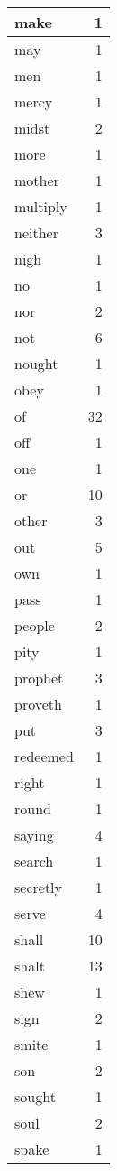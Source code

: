 \begin{center}
\begin{longtable}{l|r}
make & 1 \\ \hline
may & 1 \\ \hline
men & 1 \\ \hline
mercy & 1 \\ \hline
midst & 2 \\ \hline
more & 1 \\ \hline
mother & 1 \\ \hline
multiply & 1 \\ \hline
neither & 3 \\ \hline
nigh & 1 \\ \hline
no & 1 \\ \hline
nor & 2 \\ \hline
not & 6 \\ \hline
nought & 1 \\ \hline
obey & 1 \\ \hline
of & 32 \\ \hline
off & 1 \\ \hline
one & 1 \\ \hline
or & 10 \\ \hline
other & 3 \\ \hline
out & 5 \\ \hline
own & 1 \\ \hline
pass & 1 \\ \hline
people & 2 \\ \hline
pity & 1 \\ \hline
prophet & 3 \\ \hline
proveth & 1 \\ \hline
put & 3 \\ \hline
redeemed & 1 \\ \hline
right & 1 \\ \hline
round & 1 \\ \hline
saying & 4 \\ \hline
search & 1 \\ \hline
secretly & 1 \\ \hline
serve & 4 \\ \hline
shall & 10 \\ \hline
shalt & 13 \\ \hline
shew & 1 \\ \hline
sign & 2 \\ \hline
smite & 1 \\ \hline
son & 2 \\ \hline
sought & 1 \\ \hline
soul & 2 \\ \hline
spake & 1 \\ \hline

\end{longtable}
\end{center}
